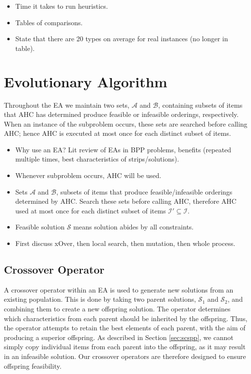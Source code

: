 \documentclass{elsarticle}
\begin{document}
{\color{Rhodamine}
\begin{itemize}[leftmargin=*]
	\item Time it takes to run heuristics.
	\item Tables of comparisons.
	\item State that there are 20 types on average for real instances (no longer in table).
\end{itemize}
}


\section{Evolutionary Algorithm}
\label{sec:ea}
Throughout the EA we maintain two sets, $\mathcal{A}$ and $\mathcal{B}$, containing subsets of items that AHC has determined produce feasible or infeasible orderings, respectively. When an instance of the subproblem occurs, these sets are searched before calling AHC; hence AHC is executed at most once for each distinct subset of items.

{\color{OrangeRed}
\begin{itemize}[leftmargin=*]
	\item Why use an EA? Lit review of EAs in BPP problems, benefits (repeated multiple times, best characteristics of strips/solutions).
	\item Whenever subproblem occurs, AHC will be used.
	\item Sets $\mathcal{A}$ and $\mathcal{B}$, subsets of items that produce feasible/infeasible orderings determined by AHC. Search these sets before calling AHC, therefore AHC used at most once for each distinct subset of items $\mathcal{I}' \subseteq \mathcal{I}$.
	\item Feasible solution $\mathcal{S}$ means solution abides by all constraints.
	\item First discuss xOver, then local search, then mutation, then whole process.
\end{itemize}
}


\subsection{Crossover Operator}
\label{sub:xover}
A crossover operator within an EA is used to generate new solutions from an existing population. This is done by taking two parent solutions, $\mathcal{S}_1$ and $\mathcal{S}_2$, and combining them to create a new offspring solution. The operator determines which characteristics from each parent should be inherited by the offspring. Thus, the operator attempts to retain the best elements of each parent, with the aim of producing a superior offspring. As described in Section \ref{sec:scspp}, we cannot simply copy individual items from each parent into the offspring, as it may result in an infeasible solution. Our crossover operators are therefore designed to ensure offspring feasibility.
\end{document}
